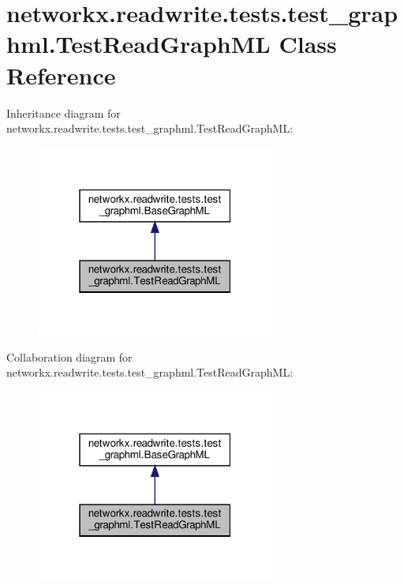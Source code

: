 \hypertarget{classnetworkx_1_1readwrite_1_1tests_1_1test__graphml_1_1TestReadGraphML}{}\section{networkx.\+readwrite.\+tests.\+test\+\_\+graphml.\+Test\+Read\+Graph\+ML Class Reference}
\label{classnetworkx_1_1readwrite_1_1tests_1_1test__graphml_1_1TestReadGraphML}


Inheritance diagram for networkx.\+readwrite.\+tests.\+test\+\_\+graphml.\+Test\+Read\+Graph\+ML\+:
\nopagebreak
\begin{figure}[H]
\begin{center}
\leavevmode
\includegraphics[width=223pt]{classnetworkx_1_1readwrite_1_1tests_1_1test__graphml_1_1TestReadGraphML__inherit__graph}
\end{center}
\end{figure}


Collaboration diagram for networkx.\+readwrite.\+tests.\+test\+\_\+graphml.\+Test\+Read\+Graph\+ML\+:
\nopagebreak
\begin{figure}[H]
\begin{center}
\leavevmode
\includegraphics[width=223pt]{classnetworkx_1_1readwrite_1_1tests_1_1test__graphml_1_1TestReadGraphML__coll__graph}
\end{center}
\end{figure}
